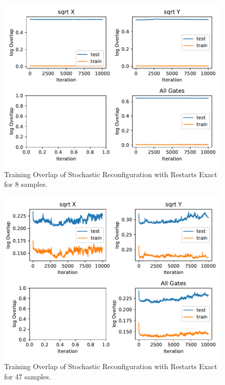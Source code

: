 \begin{figure}[H]
  \centering
  \includegraphics[width=\textwidth]{figures/results/SR-restarts-not-learned/avgOverlap_8.pdf}
  \caption[Training Overlap of Stochastic Reconfiguration with Restarts Exact]{Training 
  Overlap of Stochastic Reconfiguration with Restarts Exact for 8 samples.}
  \label{fig:sr_tvd}
\end{figure}

\begin{figure}[H]
  \centering
  \includegraphics[width=\textwidth]{figures/results/SR-restarts-not-learned/avgOverlap_47.pdf}
  \caption[Training Overlap of Stochastic Reconfiguration with Restarts Exact]{Training 
  Overlap of Stochastic Reconfiguration with Restarts Exact for 47 samples.}
  \label{fig:sr_tvd}
\end{figure}

